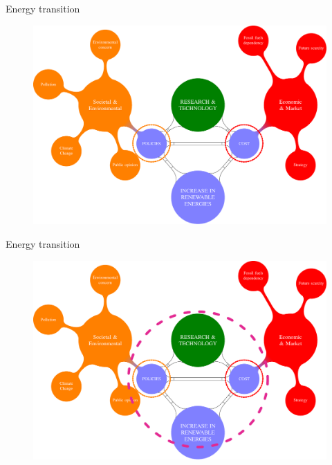 \documentclass{beamer}%
\begin{document}


\begin{frame}[fragile]{Energy transition}
\begin{figure}
\centering\includegraphics[scale=0.42]{diagram4.pdf}
\end{figure} 
\end{frame}

\begin{frame}[fragile]{Energy transition}
\begin{figure}
\centering\includegraphics[scale=0.42]{diagram5pdf.pdf}
\end{figure} 
\end{frame}
\end{document}
